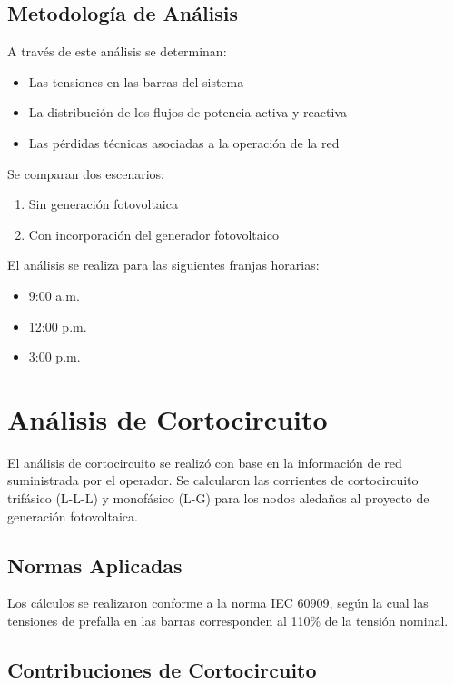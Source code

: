 \subsection{Metodología de Análisis}

A través de este análisis se determinan:

\begin{itemize}
    \item Las tensiones en las barras del sistema
    \item La distribución de los flujos de potencia activa y reactiva
    \item Las pérdidas técnicas asociadas a la operación de la red
\end{itemize}

Se comparan dos escenarios:
\begin{enumerate}
    \item Sin generación fotovoltaica
    \item Con incorporación del generador fotovoltaico
\end{enumerate}

El análisis se realiza para las siguientes franjas horarias:
\begin{itemize}
    \item 9:00 a.m.
    \item 12:00 p.m.
    \item 3:00 p.m.
\end{itemize}

\section{Análisis de Cortocircuito}

El análisis de cortocircuito se realizó con base en la información de red suministrada por el operador. Se calcularon las corrientes de cortocircuito trifásico (L-L-L) y monofásico (L-G) para los nodos aledaños al proyecto de generación fotovoltaica.

\subsection{Normas Aplicadas}

Los cálculos se realizaron conforme a la norma IEC 60909, según la cual las tensiones de prefalla en las barras corresponden al 110\% de la tensión nominal.

\subsection{Contribuciones de Cortocircuito}

